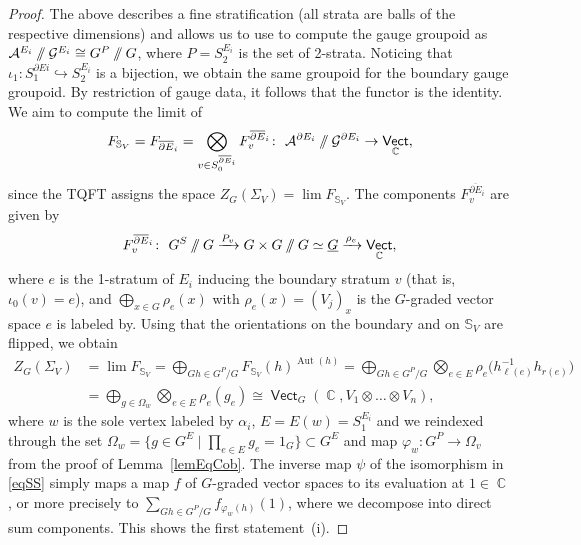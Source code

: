\documentclass[pdftex]{sigma}
\DeclareMathOperator{\Aut}{Aut}
\DeclareMathOperator{\vect}{\mathsf{Vect}}
\DeclareMathOperator{\C}{\mathbb{C}}
\newcommand{\sslash}{\mathbin{/\mkern-6mu/}}
\numberwithin{equation}{section}
\theoremstyle{definition}
\begin{document}
\begin{proof}
 The above describes a fine stratification (all strata are balls of the respective dimensions) and allows us to use \cite[Corollary~5.23]{FMM} to compute the gauge groupoid as $\mathcal{A}^{E_i}\sslash \mathcal{G}^{E_i} \cong G^P \sslash G$, where $P = S_2^{E_i}$ is the set of 2-strata. Noticing that $\iota_1\colon S_1^{\partial Ei} \hookrightarrow S_2^{E_i}$ is a bijection, we obtain the same groupoid for the boundary gauge groupoid. By restriction of gauge data, it follows that the functor \smash{$P_{\partial}\colon \mathcal{A}^{E_i}\sslash \mathcal{G}^{E_i} \rightarrow \mathcal{A}^{\partial E_i}\sslash \mathcal{G}^{\partial E_i}$} is the identity. We aim to compute the limit of
 \begin{align*}
 F_{\mathbb{S}_V} = F_{\overline{\partial E}_i} = \bigotimes_{v \in S_0^{\overline{\partial E}_i}} F_v^{\overline{\partial E}_i}\colon \ \mathcal{A}^{\partial E_i}\sslash \mathcal{G}^{\partial E_i} \rightarrow \vect_{\C},
 \end{align*}
 since the TQFT assigns the space $Z_G(\Sigma_V)= \lim F_{\mathbb{S}_V}$. The components $F_v^{\overline{\partial E}_i}$ are given by
 \begin{align*}
 F_v^{\overline{\partial E}_i} \colon \ G^S \sslash G \xrightarrow{P_v} G \times G \sslash G \simeq \underline{G} \xrightarrow{\rho_e} \vect_{\C},
 \end{align*}
 where $e$ is the 1-stratum of $E_i$ inducing the boundary stratum $v$ (that is, $\iota_0(v) = e$), and $\bigoplus_{x \in G}\rho_e(x)$ with $\rho_e(x) = (V_j)_x$ is the $G$-graded vector space $e$ is labeled by. Using that the orientations on the boundary and on $\mathbb{S}_V$ are flipped, we obtain
 \begin{align}
 Z_G(\Sigma_V) &= \lim F_{\mathbb{S}_V} = \bigoplus_{Gh \in G^P/G} F_{\mathbb{S}_V}(h)^{\Aut(h)} = \bigoplus_{Gh \in G^P/G} \bigotimes_{e \in E} \rho_e\bigl(h_{\ell(e)}^{-1} h_{r(e)}\bigr) \nonumber \\ &= \bigoplus_{g \in \Omega_w} \bigotimes_{e \in E} \rho_e(g_e) \cong \vect_G(\C, V_1 \otimes \dots \otimes V_n),\label{eqSS}
 \end{align}
 where $w$ is the sole vertex labeled by $\alpha_i$, $E = E(w) = S_1^{E_i}$ and we reindexed through the set $\Omega_w = \big\{g \in G^E \mid \prod_{e \in E}g_e = 1_G \big\} \subset G^E$ and map $\varphi_w\colon G^P \rightarrow \Omega_v$ from the proof of Lemma~\ref{lemEqCob}. The inverse map $\psi$ of the isomorphism in \eqref{eqSS} simply maps a map $f$ of $G$-graded vector spaces to its evaluation at $1 \in \C$, or more precisely to $\sum_{Gh \in G^P/G}f_{\varphi_w(h)}(1)$, where we decompose into direct sum components. This shows the first statement~(i).


\end{proof}
\end{document}
